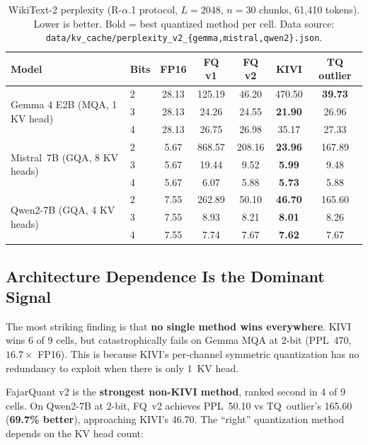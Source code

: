 \documentclass[10pt,twocolumn]{article}
\begin{document}
\begin{table}[t]
\centering
\small
\caption{WikiText-2 perplexity (R-$\alpha$.1 protocol, $L{=}2048$,
$n{=}30$ chunks, 61,410 tokens). Lower is better. Bold = best
quantized method per cell. Data source:
\texttt{data/kv\_cache/perplexity\_v2\_\{gemma,mistral,qwen2\}.json}.}
\label{tab:ppl_crossmodel}
\begin{tabular}{ll|ccccc}
\toprule
Model & Bits & FP16 & FQ v1 & \textbf{FQ v2} & KIVI & TQ outlier \\
\midrule
\multirow{3}{*}{Gemma 4 E2B (MQA, 1 KV head)}
 & 2 & 28.13 & 125.19 & 46.20 & 470.50 & \textbf{39.73} \\
 & 3 & 28.13 & 24.26 & 24.55 & \textbf{21.90} & 26.96 \\
 & 4 & 28.13 & 26.75 & 26.98 & 35.17 & 27.33 \\
\midrule
\multirow{3}{*}{Mistral~7B (GQA, 8 KV heads)}
 & 2 & 5.67 & 868.57 & 208.16 & \textbf{23.96} & 167.89 \\
 & 3 & 5.67 & 19.44 & 9.52 & \textbf{5.99} & 9.48 \\
 & 4 & 5.67 & 6.07 & 5.88 & \textbf{5.73} & 5.88 \\
\midrule
\multirow{3}{*}{Qwen2-7B (GQA, 4 KV heads)}
 & 2 & 7.55 & 262.89 & 50.10 & \textbf{46.70} & 165.60 \\
 & 3 & 7.55 & 8.93 & 8.21 & \textbf{8.01} & 8.26 \\
 & 4 & 7.55 & 7.74 & 7.67 & \textbf{7.62} & 7.67 \\
\bottomrule
\end{tabular}
\end{table}

\subsection{Architecture Dependence Is the Dominant Signal}

The most striking finding is that \textbf{no single method wins
everywhere}. KIVI wins 6 of 9 cells, but catastrophically fails on
Gemma MQA at 2-bit (PPL~470, $16.7\times$ FP16). This is because
KIVI's per-channel symmetric quantization has no redundancy to exploit
when there is only 1~KV head.

FajarQuant v2 is the \textbf{strongest non-KIVI method}, ranked second
in 4 of 9 cells. On Qwen2-7B at 2-bit, FQ~v2 achieves PPL~50.10 vs
TQ~outlier's 165.60 (\textbf{69.7\% better}), approaching KIVI's
46.70. The ``right'' quantization method depends on the KV head count:
\end{document}
